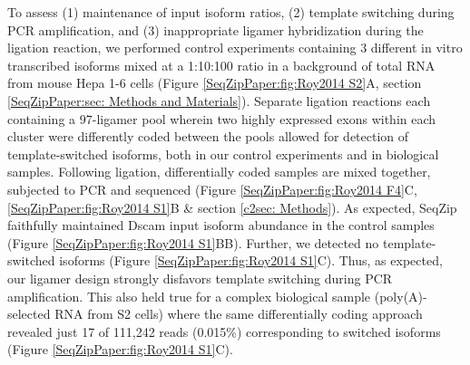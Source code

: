 		To assess (1) maintenance of input isoform ratios, (2) template switching during PCR amplification, and (3) inappropriate ligamer hybridization during the ligation reaction, we performed control experiments containing 3 different in vitro transcribed \dscam{} isoforms mixed at a 1:10:100 ratio in a background of total RNA from mouse Hepa 1-6 cells (Figure \ref{SeqZipPaper:fig:Roy2014 S2}A, section \ref{SeqZipPaper:sec: Methods and Materials}). Separate ligation reactions each containing a 97-ligamer pool wherein two highly expressed exons within each cluster were differently coded between the pools allowed for detection of template-switched isoforms, both in our control experiments and in biological samples. Following ligation, differentially coded samples are mixed together, subjected to PCR and sequenced (Figure \ref{SeqZipPaper:fig:Roy2014 F4}C, \ref{SeqZipPaper:fig:Roy2014 S1}B \& section \ref{c2sec: Methods}).  As expected, SeqZip faithfully maintained Dscam input isoform abundance in the control samples (Figure \ref{SeqZipPaper:fig:Roy2014 S1}BB). Further, we detected no template-switched isoforms (Figure \ref{SeqZipPaper:fig:Roy2014 S1}C). Thus, as expected, our ligamer design strongly disfavors template switching during PCR amplification. This also held true for a complex biological sample (poly(A)-selected RNA from S2 cells) where the same differentially coding approach revealed just 17 of 111,242 reads (0.015\%) corresponding to switched isoforms (Figure \ref{SeqZipPaper:fig:Roy2014 S1}C).

